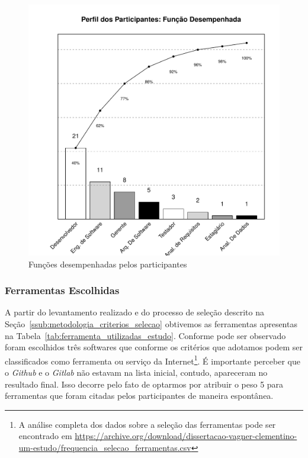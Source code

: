 \begin{figure}[htpb]
	\centering
	\includegraphics[width=0.7\linewidth]{./chapter-estudo-funcionalidades-fgrm/img/grafico_escolha_ferramentas_funcao_participantes.pdf}
	\caption{Funções desempenhadas pelos participantes}
\label{fig:grafico_escolha_ferramentas_funcao_participantes}
\end{figure}

\subsubsection{Ferramentas Escolhidas}
\label{subsec:resultados_ferramentas_escolhidas}

A partir do levantamento realizado e do processo de seleção descrito na
Seção~\ref{ssub:metodologia_criterios_selecao} obtivemos as ferramentas
apresentas na Tabela~\ref{tab:ferramenta_utilizadas_estudo}. Conforme pode ser
observado foram escolhidos três softwares que conforme os critérios que
adotamos podem ser classificados como ferramenta ou serviço da
Internet\footnote{A análise completa dos dados sobre a seleção das ferramentas
    pode ser encontrado em
    \url{https://archive.org/download/dissertacao-vagner-clementino-um-estudo/frequencia_selecao_ferramentas.csv}}.
É importante perceber que o \textit{Github} e o \textit{Gitlab} não estavam na
lista inicial, contudo, apareceram no resultado final. Isso decorre pelo fato
de optarmos por atribuir o peso 5 para ferramentas que foram citadas pelos
participantes de maneira espontânea.

